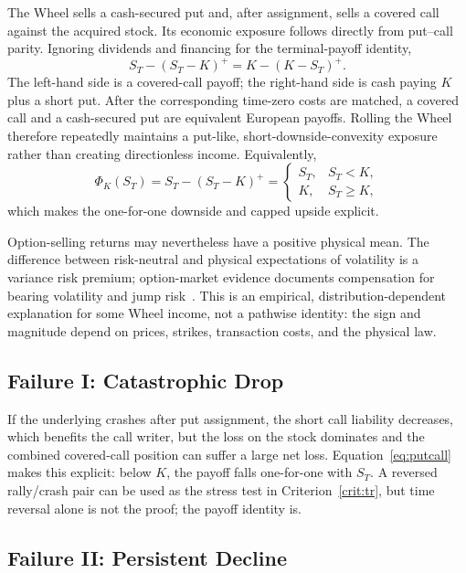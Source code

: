 \documentclass[aps,pra,reprint,superscriptaddress,amsmath,amssymb,floatfix]{revtex4-2}
\theoremstyle{plain}
\theoremstyle{definition}
\theoremstyle{remark}
\begin{document}
The Wheel sells a cash-secured put and, after assignment, sells a covered call
against the acquired stock. Its economic exposure follows directly from
put--call parity. Ignoring dividends and financing for the terminal-payoff
identity,
\begin{equation}
  S_T-(S_T-K)^+
  =K-(K-S_T)^+.
  \label{eq:putcall}
\end{equation}
The left-hand side is a covered-call payoff; the right-hand side is cash
paying \(K\) plus a short put. After the corresponding time-zero costs are
matched, a covered call and a cash-secured put are equivalent European
payoffs. Rolling the Wheel therefore repeatedly maintains a put-like,
short-downside-convexity exposure rather than creating directionless income.
Equivalently,
\begin{equation}
  \Phi_K(S_T)
  =S_T-(S_T-K)^+
  =
  \begin{cases}
    S_T,&S_T<K,\\
    K,&S_T\geq K,
  \end{cases}
  \label{eq:wheelpiecewise}
\end{equation}
which makes the one-for-one downside and capped upside explicit.

Option-selling returns may nevertheless have a positive physical mean. The
difference between risk-neutral and physical expectations of volatility is a
variance risk premium; option-market evidence documents compensation for
bearing volatility and jump risk~\cite{BakshiKapadia2003,CarrWu2009}. This is
an empirical, distribution-dependent explanation for some Wheel income, not a
pathwise identity: the sign and magnitude depend on prices, strikes,
transaction costs, and the physical law.

\subsection{Failure I: Catastrophic Drop}

If the underlying crashes after put assignment, the short call liability
decreases, which benefits the call writer, but the loss on the stock dominates
and the combined covered-call position can suffer a large net loss.
Equation~\eqref{eq:putcall} makes this explicit: below \(K\), the payoff falls
one-for-one with \(S_T\). A reversed rally/crash pair can be used as the stress
test in Criterion~\ref{crit:tr}, but time reversal alone is not the proof; the
payoff identity is.

\subsection{Failure II: Persistent Decline}
\end{document}

